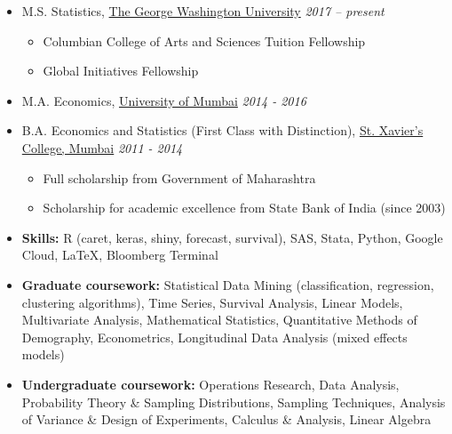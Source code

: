 \documentclass[10pt,a4paper]{article}
\begin{document}
\begin{itemize}
	\itemsep-0.25em
\item M.S. Statistics, \href{https://www.gwu.edu/}{The George Washington University}
\hfill \textit{2017 -- present} 
	\vspace{-0.6em}
	\begin{itemize}
	\itemsep-0.12em
		\item Columbian College of Arts and Sciences Tuition Fellowship
		\item Global Initiatives Fellowship
	\end{itemize}
	\vspace{-0.3em}
\item M.A. Economics, \href{http://mu.ac.in/portal/}{University of Mumbai}
\hfill \textit{2014 - 2016}

\item B.A. Economics and Statistics (First Class with Distinction), \href{http://xaviers.edu/main/}{St. Xavier's College, Mumbai}
\hfill \textit{2011 - 2014}
	\vspace{-0.6em}
	\begin{itemize}
	\itemsep-0.15em
		\item Full scholarship from Government of Maharashtra
		\item Scholarship for academic excellence from State Bank of India (since 2003)
	\end{itemize}
\end{itemize}
\vspace{-0.6cm}
\begin{itemize}
	\itemsep-0.15em
\item \textbf{Skills: }R (caret, keras, shiny, forecast, survival), SAS, Stata, Python, Google Cloud, \LaTeX, Bloomberg Terminal
\item \textbf{Graduate coursework: }Statistical Data Mining (classification, regression, clustering algorithms), Time Series, Survival Analysis, Linear Models, Multivariate Analysis, Mathematical Statistics, Quantitative Methods of Demography, Econometrics, Longitudinal Data Analysis (mixed effects models)
\item \textbf{Undergraduate coursework: }Operations Research, Data Analysis, Probability Theory \& Sampling Distributions, Sampling Techniques, Analysis of Variance \& Design of Experiments, Calculus \& Analysis, Linear Algebra 
\end{itemize}
\vspace{-0.6cm}
\end{document}
